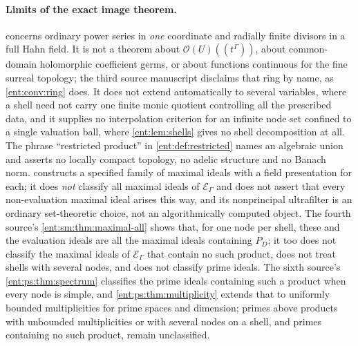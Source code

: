 \documentclass[11pt]{article}
\theoremstyle{plain}
\theoremstyle{plain}
\theoremstyle{plain}
\theoremstyle{definition}
\theoremstyle{definition}
\theoremstyle{definition}
\theoremstyle{definition}
\theoremstyle{remark}
\newcommand{\E}{\mathcal E_\Gamma}
\begin{document}
\paragraph{Limits of the exact image theorem.}
 concerns ordinary power series in \emph{one}
coordinate and radially finite divisors in a full Hahn field. It is not a
theorem about $\mathcal O(U)((t^\Gamma))$, about common-domain holomorphic
coefficient germs, or about functions continuous for the fine surreal
topology; the third source manuscript disclaims that ring by name, as
\cref{ent:conv:ring} does. It does not extend automatically to several
variables, where a shell need not carry one finite monic quotient controlling
all the prescribed data, and it supplies no interpolation criterion for an
infinite node set confined to a single valuation ball, where
\cref{ent:lem:shells} gives no shell decomposition at all. The phrase
``restricted product'' in \cref{ent:def:restricted} names an algebraic union
and asserts no locally compact topology, no adelic structure and no Banach
norm.  constructs a specified family of maximal ideals
with a field presentation for each; it does \emph{not} classify all maximal
ideals of $\E$ and does not assert that every non-evaluation maximal ideal
arises this way, and its nonprincipal ultrafilter is an ordinary
set-theoretic choice, not an algorithmically computed object. The fourth
source's \cref{ent:sm:thm:maximal-all} shows that, for one node per shell,
these and the evaluation ideals are all the maximal ideals containing $P_D$;
it too does not classify the maximal ideals of $\E$ that contain no such
product, does not treat shells with several nodes, and does not classify
prime ideals. The sixth source's \cref{ent:ps:thm:spectrum} classifies the
prime ideals containing such a product when every node is simple, and
\cref{ent:ps:thm:multiplicity} extends that to uniformly bounded
multiplicities for prime spaces and dimension; primes above products with
unbounded multiplicities or with several nodes on a shell, and primes
containing no such product, remain unclassified.
\end{document}
